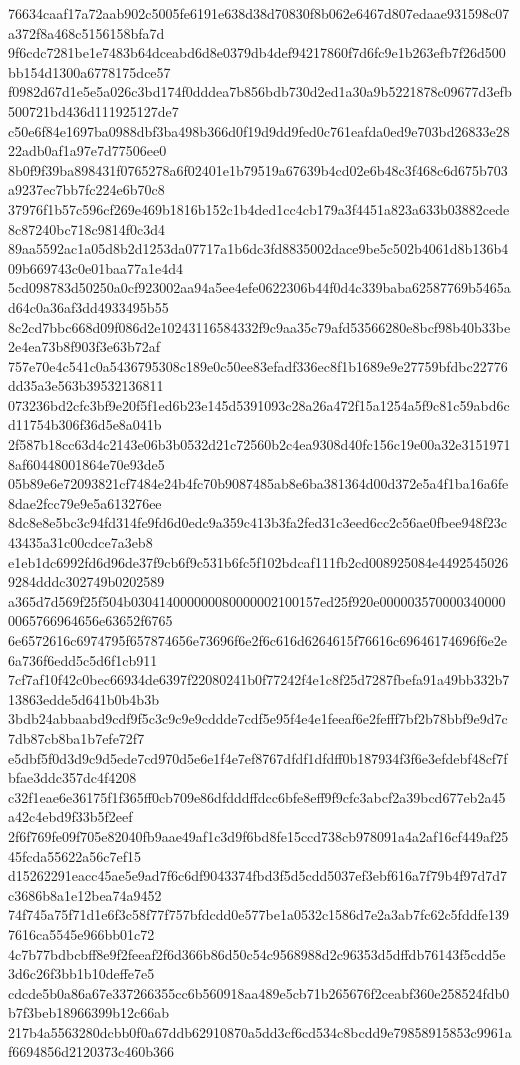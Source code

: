 {76634caaf17a72aab902c5005fe6191e638d38d70830f8b062e6467d807edaae931598c07a372f8a468c5156158bfa7d
9f6cdc7281be1e7483b64dceabd6d8e0379db4def94217860f7d6fc9e1b263efb7f26d500bb154d1300a6778175dce57
f0982d67d1e5e5a026c3bd174f0dddea7b856bdb730d2ed1a30a9b5221878c09677d3efb500721bd436d111925127de7
c50e6f84e1697ba0988dbf3ba498b366d0f19d9dd9fed0c761eafda0ed9e703bd26833e2822adb0af1a97e7d77506ee0
8b0f9f39ba898431f0765278a6f02401e1b79519a67639b4cd02e6b48c3f468c6d675b703a9237ec7bb7fc224e6b70c8
37976f1b57c596cf269e469b1816b152c1b4ded1cc4cb179a3f4451a823a633b03882cede8c87240bc718c9814f0c3d4
89aa5592ac1a05d8b2d1253da07717a1b6dc3fd8835002dace9be5c502b4061d8b136b409b669743c0e01baa77a1e4d4
5cd098783d50250a0cf923002aa94a5ee4efe0622306b44f0d4c339baba62587769b5465ad64c0a36af3dd4933495b55
8c2cd7bbc668d09f086d2e10243116584332f9c9aa35c79afd53566280e8bcf98b40b33be2e4ea73b8f903f3e63b72af
757e70e4c541c0a5436795308c189e0c50ee83efadf336ec8f1b1689e9e27759bfdbc22776dd35a3e563b39532136811
073236bd2cfc3bf9e20f5f1ed6b23e145d5391093c28a26a472f15a1254a5f9c81c59abd6cd11754b306f36d5e8a041b
2f587b18cc63d4c2143e06b3b0532d21c72560b2c4ea9308d40fc156c19e00a32e31519718af60448001864e70e93de5
05b89e6e72093821cf7484e24b4fc70b9087485ab8e6ba381364d00d372e5a4f1ba16a6fe8dae2fcc79e9e5a613276ee
8dc8e8e5bc3c94fd314fe9fd6d0edc9a359c413b3fa2fed31c3eed6cc2c56ae0fbee948f23c43435a31c00cdce7a3eb8
e1eb1dc6992fd6d96de37f9cb6f9c531b6fc5f102bdcaf111fb2cd008925084e44925450269284dddc302749b0202589
a365d7d569f25f504b030414000000080000002100157ed25f920e0000035700003400000065766964656e63652f6765
6e6572616c6974795f657874656e73696f6e2f6c616d6264615f76616c69646174696f6e2e6a736f6edd5c5d6f1cb911
7cf7af10f42c0bec66934de6397f22080241b0f77242f4e1c8f25d7287fbefa91a49bb332b713863edde5d641b0b4b3b
3bdb24abbaabd9cdf9f5c3c9c9e9cddde7cdf5e95f4e4e1feeaf6e2fefff7bf2b78bbf9e9d7c7db87cb8ba1b7efe72f7
e5dbf5f0d3d9c9d5ede7cd970d5e6e1f4e7ef8767dfdf1dfdff0b187934f3f6e3efdebf48cf7fbfae3ddc357dc4f4208
c32f1eae6e36175f1f365ff0cb709e86dfdddffdcc6bfe8eff9f9cfc3abcf2a39bcd677eb2a45a42c4ebd9f33b5f2eef
2f6f769fe09f705e82040fb9aae49af1c3d9f6bd8fe15ccd738cb978091a4a2af16cf449af2545fcda55622a56c7ef15
d15262291eacc45ae5e9ad7f6c6df9043374fbd3f5d5cdd5037ef3ebf616a7f79b4f97d7d7c3686b8a1e12bea74a9452
74f745a75f71d1e6f3c58f77f757bfdcdd0e577be1a0532c1586d7e2a3ab7fc62c5fddfe1397616ca5545e966bb01c72
4c7b77bdbcbff8e9f2feeaf2f6d366b86d50c54c9568988d2c96353d5dffdb76143f5cdd5e3d6c26f3bb1b10deffe7e5
cdcde5b0a86a67e337266355cc6b560918aa489e5cb71b265676f2ceabf360e258524fdb0b7f3beb18966399b12c66ab
217b4a5563280dcbb0f0a67ddb62910870a5dd3cf6cd534c8bcdd9e79858915853c9961af6694856d2120373c460b366
}
